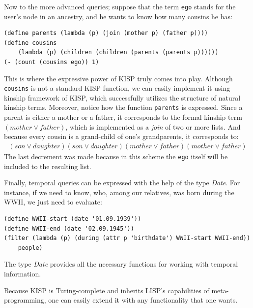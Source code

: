Now to the more advanced queries; suppose that the term \texttt{ego} stands for the user's node in an ancestry, and he wants to
know how many cousins he has:
\begin{verbatim}
(define parents (lambda (p) (join (mother p) (father p))))
(define cousins
    (lambda (p) (children (children (parents (parents p))))))
(- (count (cousins ego)) 1)
\end{verbatim}
This is where the expressive power of KISP truly comes into play. Although \texttt{cousins} is not a standard KISP function, we
can easily implement it using kinship framework of KISP, which successfully utilizes the structure of natural kinship terms.
Moreover, notice how the function \texttt{parents} is expressed. Since a parent is either a mother or a father, it corresponds to
the formal kinship term $(mother \vee father)$, which is implemented as a \textit{join} of two or more lists. And because every
cousin is a grand-child of one's grandparents, it corresponds to:
\begin{align*}
    (son \vee daughter)(son \vee daughter)(mother \vee father)(mother \vee father)
\end{align*}
The last decrement was made because in this scheme the \texttt{ego} itself will be included to the resulting list.

Finally, temporal queries can be expressed with the help of the type \textit{Date}. For instance, if we need to know, who, among our
relatives, was born during the WWII, we just need to evaluate:
\begin{verbatim}
(define WWII-start (date '01.09.1939'))
(define WWII-end (date '02.09.1945'))
(filter (lambda (p) (during (attr p 'birthdate') WWII-start WWII-end))
    people)
\end{verbatim}
The type \textit{Date} provides all the necessary functions for working with temporal information.

Because KISP is Turing-complete and inherits LISP's capabilities of meta-programming, one can easily extend it with any
functionality that one wants.
